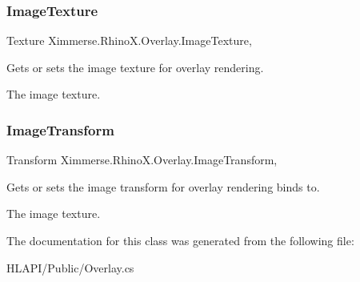 \subsubsection{\texorpdfstring{Image\+Texture}{ImageTexture}}
{\footnotesize\ttfamily Texture Ximmerse.\+Rhino\+X.\+Overlay.\+Image\+Texture\hspace{0.3cm}{\ttfamily [get]}, {\ttfamily [set]}}



Gets or sets the image texture for overlay rendering. 

The image texture.\mbox{\label{class_ximmerse_1_1_rhino_x_1_1_overlay_a146fe73ef50033f83d4eac7354dded8e}} 
\subsubsection{\texorpdfstring{Image\+Transform}{ImageTransform}}
{\footnotesize\ttfamily Transform Ximmerse.\+Rhino\+X.\+Overlay.\+Image\+Transform\hspace{0.3cm}{\ttfamily [get]}, {\ttfamily [set]}}



Gets or sets the image transform for overlay rendering binds to. 

The image texture.

The documentation for this class was generated from the following file\+:\begin{DoxyCompactItemize}
\item 
H\+L\+A\+P\+I/\+Public/Overlay.\+cs\end{DoxyCompactItemize}
